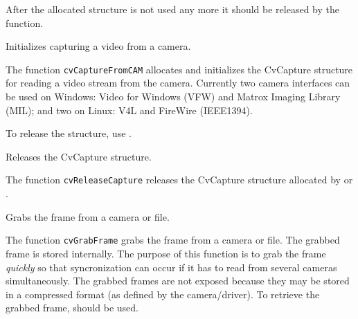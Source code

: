 After the allocated structure is not used any more it should be released by the  function.


Initializes capturing a video from a camera.


\begin{description}
\end{description}

The function \texttt{cvCaptureFromCAM} allocates and initializes the CvCapture structure for reading a video stream from the camera. Currently two camera interfaces can be used on Windows: Video for Windows (VFW) and Matrox Imaging Library (MIL); and two on Linux: V4L and FireWire (IEEE1394).

To release the structure, use .

\ifC
{} 

Releases the CvCapture structure.


\begin{description}
\end{description}

The function \texttt{cvReleaseCapture} releases the CvCapture structure allocated by  or .
\fi


Grabs the frame from a camera or file.


\begin{description}
\end{description}

The function \texttt{cvGrabFrame} grabs the frame from a camera or file. The grabbed frame is stored internally. The purpose of this function is to grab the frame \emph{quickly} so that syncronization can occur if it has to read from several cameras simultaneously. The grabbed frames are not exposed because they may be stored in a compressed format (as defined by the camera/driver). To retrieve the grabbed frame,  should be used.

